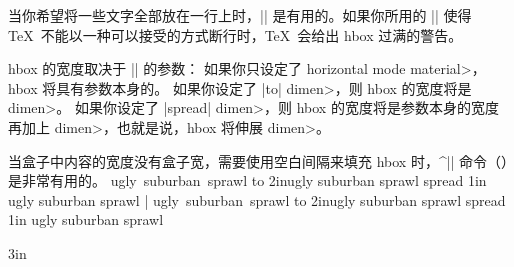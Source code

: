 当你希望将一些文字全部放在一行上时，|\hbox| 是有用的。如果你所用的 |\hbox| 使得 \TeX\ 不能以一种可以接受的方式断行时，\TeX\ 会给出 hbox 过满的警告。

hbox 的宽度取决于 |\hbox| 的参数：
\ulist\compact
\li 如果你只设定了 \<horizontal mode material>，hbox 将具有参数本身的。
\li 如果你设定了 |to| \<dimen>，则 hbox 的宽度将是 \<dimen>。
\li 如果你设定了 |spread| \<dimen>，则 hbox 的宽度将是参数本身的宽度再加上 \<dimen>，也就是说，hbox 将伸展 \<dimen>。
\endulist

当盒子中内容的宽度没有盒子宽，需要使用空白间隔来填充 hbox 时，^|\hfil| 命令（\xref\hfil ）是非常有用的。
\example
\hbox{ugly suburban sprawl}
\hbox to 2in{ugly \hfil suburban \hfil sprawl}
\hbox spread 1in {ugly \hfil suburban \hfil sprawl}
|
\produces
\hbox{ugly suburban sprawl}
\hbox to 2in{ugly \hfil suburban \hfil sprawl}
\hbox spread 1in {ugly \hfil suburban \hfil sprawl}

\doruler{\8\8\8}3{in}
\endexample
\enddesc

